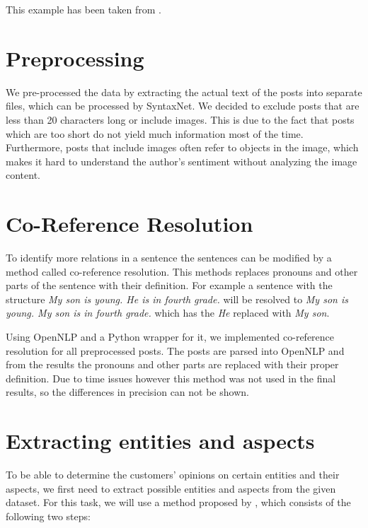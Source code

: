 \documentclass[10pt,a4paper]{article}
\begin{document}
		This example has been taken from \cite{dependency}.
	
	
	\section{Preprocessing}
	
	We pre-processed the data by extracting the actual text of the posts into separate files, which can be processed by SyntaxNet. We decided to exclude posts that are less than 20 characters long or include images. This is due to the fact that posts which are too short do not yield much information most of the time. Furthermore, posts that include images often refer to objects in the image, which makes it hard to understand the author's sentiment without analyzing the image content.
	
	
	\section{Co-Reference Resolution}
	
	To identify more relations in a sentence the sentences can be modified by a method called co-reference resolution. This methods replaces pronouns and other parts of the sentence with their definition. For example a sentence with the structure \textit{My son is young. He is in fourth grade.} will be resolved to \textit{My son is young. My son is in fourth grade.} which has the \textit{He} replaced with \textit{My son}.
	
	Using OpenNLP and a Python wrapper for it, we implemented co-reference resolution for all preprocessed posts. The posts are parsed into OpenNLP and from the results the pronouns and other parts are replaced with their proper definition. Due to time issues however this method was not used in the final results, so the differences in precision can not be shown.
	
	
	\section{Extracting entities and aspects}
	\label{sec:extraction}
	To be able to determine the customers' opinions on certain entities and their aspects, we first need to extract possible entities and aspects from the given dataset. For this task, we will use a method proposed by \cite{Hu:2004:MSC:1014052.1014073}, which consists of the following two steps:
	
\end{document}
